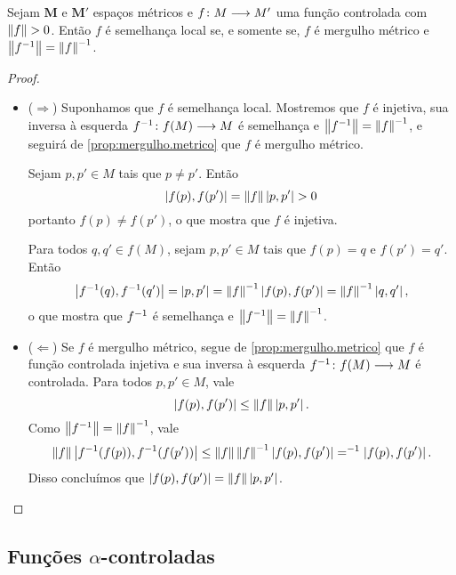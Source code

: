 \begin{proposition}
\label{prop:}
Sejam $\bm{M}$ e $\bm{M'}$ espaços métricos e ${f}\colon {M} \longrightarrow {M'}$ uma função controlada com $\left\Vert{f}\right\Vert>0$. Então $f$ é semelhança local se, e somente se, $f$ é mergulho métrico e $\left\Vert{f^{-1}}\right\Vert=\left\Vert{f}\right\Vert^{-1}$.
\end{proposition}
\begin{proof}
	\begin{itemize}
	\item ($\Rightarrow$) Suponhamos que $f$ é semelhança local. Mostremos que $f$ é injetiva, sua inversa à esquerda ${f^{-1}}\colon {f(M)} \longrightarrow {M}$ é semelhança e $\left\Vert{f^{-1}}\right\Vert=\left\Vert{f}\right\Vert^{-1}$, e seguirá de \ref{prop:mergulho.metrico} que $f$ é mergulho métrico.

	Sejam $p,p' \in M$ tais que $p \neq p'$. Então
		\begin{equation*}
		\left\vert{f(p)},{f(p')}\right\vert = \left\Vert{f}\right\Vert\left\vert{p},{p'}\right\vert > 0
		\end{equation*}
	portanto $f(p) \neq f(p')$, o que mostra que $f$ é injetiva.

	Para todos $q,q' \in f(M)$, sejam $p,p' \in M$ tais que $f(p)=q$ e $f(p')=q'$. Então
		\begin{equation*}
		\left\vert{f^{-1}(q)},{f^{-1}(q')}\right\vert = \left\vert{p},{p'}\right\vert = \left\Vert{f}\right\Vert^{-1}\left\vert{f(p)},{f(p')}\right\vert = \left\Vert{f}\right\Vert^{-1}\left\vert{q},{q'}\right\vert,
		\end{equation*}
	o que mostra que $f^{-1}$ é semelhança e $\left\Vert{f^{-1}}\right\Vert=\left\Vert{f}\right\Vert^{-1}$.

	\item ($\Leftarrow$) Se $f$ é mergulho métrico, segue de \ref{prop:mergulho.metrico} que $f$ é função controlada injetiva e sua inversa à esquerda ${f^{-1}}\colon {f(M)} \longrightarrow {M}$ é controlada. Para todos $p,p' \in M$, vale
		\begin{equation*}
		\left\vert{f(p)},{f(p')}\right\vert \leq \left\Vert{f}\right\Vert\left\vert{p},{p'}\right\vert.
		\end{equation*}
	Como $\left\Vert{f^{-1}}\right\Vert = \left\Vert{f}\right\Vert^{-1}$, vale
		\begin{equation*}
			\left\Vert{f}\right\Vert\left\vert{f^{-1}(f(p))},{f^{-1}(f(p'))}\right\vert \leq \left\Vert{f}\right\Vert\left\Vert{f}\right\Vert^{-1}\left\vert{f(p)},{f(p')}\right\vert = ^{-1}\left\vert{f(p)},{f(p')}\right\vert.
		\end{equation*}
	Disso concluímos que $\left\vert{f(p)},{f(p')}\right\vert = \left\Vert{f}\right\Vert\left\vert{p},{p'}\right\vert$.
	\qedhere
	\end{itemize}
\end{proof}



\subsection{Funções \texorpdfstring{$\alpha$}{alfa}-controladas}

